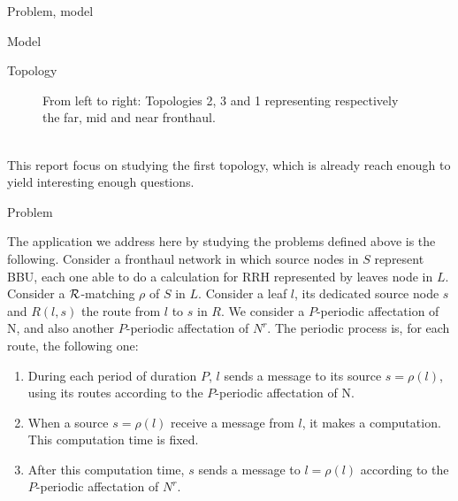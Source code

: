 \documentclass[a4paper,10pt]{report}
\begin{document}
\begin{chapter}{Problem, model}
\begin{section}{Model}
\begin{subsection}{Topology}
{{\begin{figure}[H]
\begin{center}
\end{center}
\caption{From left to right: Topologies 2, 3 and 1 representing respectively the far, mid and near fronthaul.}
\end{figure}
}}\\

This report focus on studying the first topology, which is already reach enough to yield interesting enough questions.

\end{subsection}

\end{section}
\begin{section}{Problem}
   
The application we address here by studying the problems defined above is the following. Consider a fronthaul network in which source nodes in $S$ represent BBU,
each one able to do a calculation for RRH represented by leaves node in $L$. Consider a ${\cal R}$-matching $\rho$ of $S$ in $L$. Consider a leaf $l$, its dedicated source node $s$
and $R(l,s)$ the route from $l$ to $s$ in $R$. We consider a $P$-periodic affectation of N, and also another $P$-periodic affectation of $N^{r}$.
The periodic process is, for each route, the following one:
\begin{enumerate}
 \item During each period of duration $P$, $l$ sends a message to its source $s=\rho(l)$, using its routes according to the $P$-periodic affectation of N. 
 \item When a source $s=\rho(l)$ receive a message from $l$, it makes a computation. This computation time is fixed.
 \item After this computation time, $s$ sends a message to $l=\rho(l)$ according to the $P$-periodic affectation of $N^{r}$.
\end{enumerate}

\end{section}
\end{chapter}
\end{document}
